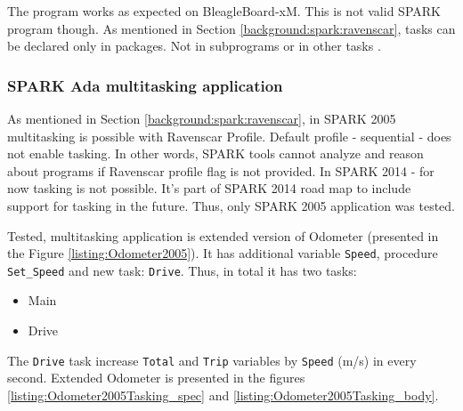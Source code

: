 The program works as expected on BleagleBoard-xM. This is not valid SPARK program though. As mentioned in Section \ref{background:spark:ravenscar}, tasks can be declared only in packages. Not in subprograms or in other tasks \cite{Barnes:Book}.

\subsubsection{SPARK Ada multitasking application}

As mentioned in Section \ref{background:spark:ravenscar}, in SPARK 2005 multitasking is possible with Ravenscar Profile. Default profile - sequential -  does not enable tasking. In other words, SPARK tools cannot analyze and reason about programs if Ravenscar profile flag is not provided. In SPARK 2014 - for now tasking is not possible. It's part of SPARK 2014 road map to include support for tasking in the future. Thus, only SPARK 2005 application was tested.

Tested, multitasking application is extended version of Odometer (presented in the Figure \ref{listing:Odometer2005}). It has additional variable \lstinline{Speed}, procedure \lstinline{Set_Speed} and new task: \lstinline{Drive}. Thus, in total it has two tasks:
\begin{itemize}
    \item Main
    \item Drive
\end{itemize}

The \lstinline{Drive} task increase \lstinline{Total} and \lstinline{Trip} variables by \lstinline{Speed} (m/s) in every second. Extended Odometer is presented in the figures \ref{listing:Odometer2005Tasking_spec} and \ref{listing:Odometer2005Tasking_body}. 

